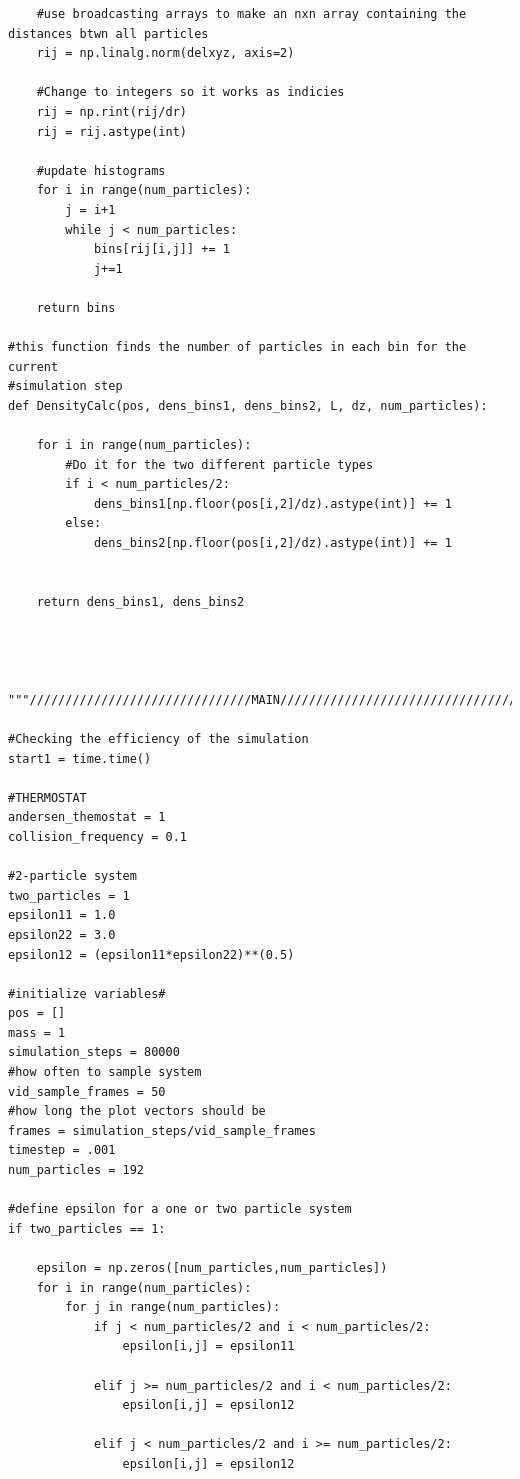 \documentclass{article}
\begin{document}
\begin{lstlisting}
    #use broadcasting arrays to make an nxn array containing the distances btwn all particles
    rij = np.linalg.norm(delxyz, axis=2)
    
    #Change to integers so it works as indicies
    rij = np.rint(rij/dr)
    rij = rij.astype(int)
    
    #update histograms
    for i in range(num_particles):
        j = i+1
        while j < num_particles:
            bins[rij[i,j]] += 1
            j+=1
    
    return bins

#this function finds the number of particles in each bin for the current 
#simulation step
def DensityCalc(pos, dens_bins1, dens_bins2, L, dz, num_particles):
        
    for i in range(num_particles):
        #Do it for the two different particle types
        if i < num_particles/2:
            dens_bins1[np.floor(pos[i,2]/dz).astype(int)] += 1
        else:
            dens_bins2[np.floor(pos[i,2]/dz).astype(int)] += 1

    
    return dens_bins1, dens_bins2




"""///////////////////////////////MAIN//////////////////////////////////////"""

#Checking the efficiency of the simulation
start1 = time.time()

#THERMOSTAT
andersen_themostat = 1
collision_frequency = 0.1

#2-particle system
two_particles = 1
epsilon11 = 1.0
epsilon22 = 3.0
epsilon12 = (epsilon11*epsilon22)**(0.5)

#initialize variables#
pos = []
mass = 1
simulation_steps = 80000
#how often to sample system
vid_sample_frames = 50
#how long the plot vectors should be
frames = simulation_steps/vid_sample_frames
timestep = .001
num_particles = 192

#define epsilon for a one or two particle system
if two_particles == 1:
    
    epsilon = np.zeros([num_particles,num_particles])
    for i in range(num_particles):
        for j in range(num_particles):
            if j < num_particles/2 and i < num_particles/2:
                epsilon[i,j] = epsilon11
                
            elif j >= num_particles/2 and i < num_particles/2:
                epsilon[i,j] = epsilon12
                
            elif j < num_particles/2 and i >= num_particles/2:
                epsilon[i,j] = epsilon12
                

\end{lstlisting}
\end{document}
